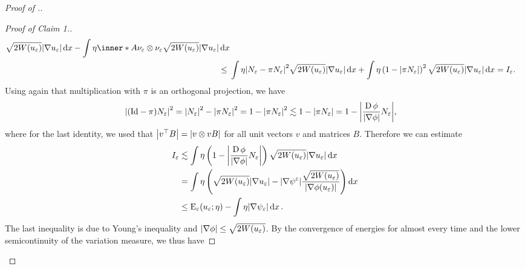 \begin{proof}[Proof of .]
\begin{proof}[Proof of Claim 1.]
\begin{align*}
{					\sqrt{ 2 W ( u_{ \varepsilon } ) } \abs{ \nabla u_{ 
					\varepsilon } }
				\dd{ x }
				-
				\int
					\eta
					\inner*{ A }
					{ \nu_{ \varepsilon } \otimes \nu_{ \varepsilon } }
					\sqrt{ 2 W ( u_{ \varepsilon } ) }
					\abs{ \nabla u_{ \varepsilon } }
				\dd{ x }
			}
			\\
			\leq{} & 
			\int
				\eta
				\abs{ N_{ \varepsilon } - \pi N_{ \varepsilon } }^{ 2 }
				\sqrt{ 2 W ( u_{ \varepsilon} ) } \abs{ \nabla u_{ \varepsilon 
				} }
			\dd{ x }
			+
			\int
				\eta
				\left( 
					1 - \abs{ \pi N_{ \varepsilon } }
				\right)^{ 2 }
				\sqrt{ 2 W ( u_{ \varepsilon } ) } \abs{ \nabla u_{ \varepsilon 
				} }
			\dd{ x }= I_{ \varepsilon }.
		\end{align*}
		Using again that multiplication with $ \pi $ is an orthogonal 
		projection, we have
		\begin{align*}
			\abs{
				( \mathrm{Id} - \pi ) N_{ \varepsilon }
			}^{ 2 }
			& =
			\abs{ N_{ \varepsilon } }^{ 2 } 
			-
			\abs{ \pi N_{ \varepsilon } }^{ 2 }
			=
			1 - \abs{ \pi N_{ \varepsilon } }^{ 2 }
			\lesssim
			1 - \abs{ \pi N_{ \varepsilon } }
			=
			1 -
			\abs{ \frac{ \operatorname{D} \phi }{ \abs{ \nabla \phi } } N_{ \varepsilon } 
			},
		\end{align*}
		where for the last identity, we used that $ \abs{ v^{ \top } B } = 
		\abs{ v \otimes v B } $ for all unit vectors $ v $ and matrices $ B $.
		Therefore we can estimate
		\begin{align*}
			I_{ \varepsilon }
			& \lesssim
			\int
				\eta
				\left(
					1 - \abs{ \frac{ \operatorname{D} \phi }{ \abs{ \nabla \phi } } N_{ 
					\varepsilon } }
				\right)
				\sqrt{ 2 W ( u_{ \varepsilon } ) }
				\abs{ \nabla u_{ \varepsilon } }
			\dd{ x }
			\\
			& =
			\int
				\eta 
				\left(
					\sqrt{ 2 W ( u_{ \varepsilon } ) }
					\abs{ \nabla u_{ \varepsilon } }
					-
					\abs{ \nabla \psi^{ \varepsilon } }
					\frac{ \sqrt{ 2 W ( u_{ \varepsilon } ) } }{ \abs{ \nabla 
					\phi ( u_{ \varepsilon } ) } }
				\right)
			\dd{ x }
			\\
			& \leq
			\operatorname{E}_{ \varepsilon } ( u_{ \varepsilon } ; \eta )
			-
			\int
				\eta
				\abs{ \nabla \psi_{ \varepsilon } }
			\dd{ x }.
		\end{align*}
		The last inequality is due to Young's inequality and $ \abs{ \nabla 
		\phi } \leq \sqrt{ 2 W ( u_{ \varepsilon } ) } $.
		By the convergence of energies for almost every time and the lower 
		semicontinuity of the variation measure, we thus have

\end{proof}
\end{proof}
